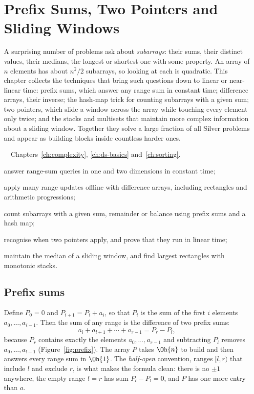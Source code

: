 \chapter{Prefix Sums, Two Pointers and Sliding Windows}\label{ch:prefix}

A surprising number of problems ask about \emph{subarrays}: their sums, their distinct values, their medians, the longest
or shortest one with some property. An array of $n$ elements has about $n^2/2$ subarrays, so looking at each is quadratic.
This chapter collects the techniques that bring such questions down to linear or near-linear time: prefix sums, which answer
any range sum in constant time; difference arrays, their inverse; the hash-map trick for counting subarrays with a given
sum; two pointers, which slide a window across the array while touching every element only twice; and the stacks and
multisets that maintain more complex information about a sliding window. Together they solve a large fraction of all Silver
problems and appear as building blocks inside countless harder ones.

\begin{chapterintro}{\bronze\ \silver\ \gold}{Chapters~\ref{ch:complexity}, \ref{ch:ds-basics} and~\ref{ch:sorting}.}
  \item answer range-sum queries in one and two dimensions in constant time;
  \item apply many range updates offline with difference arrays, including rectangles and arithmetic progressions;
  \item count subarrays with a given sum, remainder or balance using prefix sums and a hash map;
  \item recognise when two pointers apply, and prove that they run in linear time;
  \item maintain the median of a sliding window, and find largest rectangles with monotonic stacks.
\end{chapterintro}

\section[Prefix sums]{Prefix sums \hfill \bronze}\label{sec:prefix}

Define $P_0 = 0$ and $P_{i+1} = P_i + a_i$, so that $P_i$ is the sum of the first $i$ elements $a_0, \ldots, a_{i-1}$. Then
the sum of any range is the difference of two prefix sums:
\[
  a_l + a_{l+1} + \cdots + a_{r-1} = P_r - P_l ,
\]
because $P_r$ contains exactly the elements $a_0, \ldots, a_{r-1}$ and subtracting $P_l$ removes $a_0, \ldots, a_{l-1}$
(Figure~\ref{fig:prefix}). The array $P$ takes $\Oh{n}$ to build and then answers every range sum in $\Oh{1}$. The
\emph{half-open} convention, ranges $[l, r)$ that include $l$ and exclude $r$, is what makes the formula clean: there is no
$\pm 1$ anywhere, the empty range $l = r$ has sum $P_l - P_l = 0$, and $P$ has one more entry than $a$.

